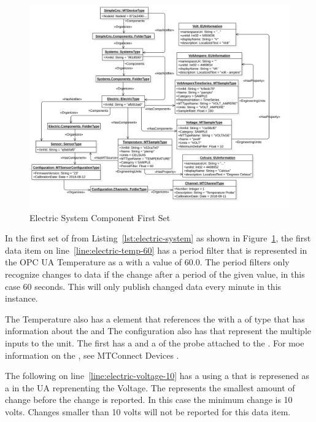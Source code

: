 \begin{figure}[ht]
  \centering
  \includegraphics[width=1.0\textwidth]{diagrams/mtconnect-mapping/electric-system.png}
  \caption{Electric System Component First Set}
  \label{fig:electric-system}
\end{figure}

In the first set of  from Listing~\ref{lst:electric-system} as shown in Figure~\ref{fig:electric-system}, the first data item on line~\ref{line:electric-temp-60} has a period filter that is represented in the OPC UA  Temperature as a   with a value of 60.0. The period filters only recognize changes to data if the change after a period of the given value, in this case 60 seconds. This will only publish changed data every minute in this instance.

The Temperature  also has a  element that references the  with a  of type  that has information about the  and  The  configuration also has  that represent the multiple inputs to the  unit. The first  has a  and a  of the probe attached to the . For moe information on the , see MTConnect Devices \cite{MTCPart2}.

The following  on line~\ref{line:electric-voltage-10} has a  using a  that is represened as a  in the UA  reprenenting the  Voltage. The  represents the smallest amount of change before the change is reported. In this case the minimum change is 10 volts. Changes smaller than 10 volts will not be reported for this data item.


